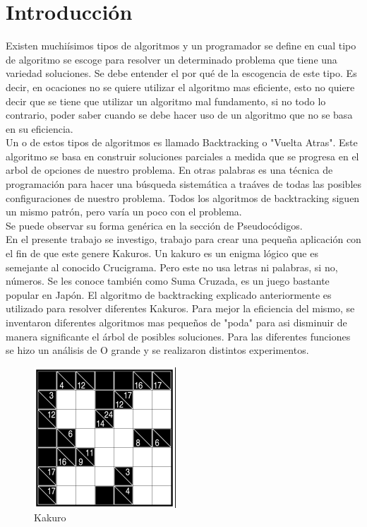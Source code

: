 \documentclass[conference]{IEEEtran}
\begin{document}
\section{Introducci\'on}
Existen muchi\'isimos tipos de algoritmos y un programador se define en cual tipo de algoritmo se escoge para resolver un determinado problema que tiene una variedad soluciones. Se debe entender el por qu\'e de la escogencia de este tipo. Es decir, en ocaciones no se quiere utilizar el algoritmo mas eficiente, esto no quiere decir que se tiene que utilizar un algoritmo mal fundamento, si no todo lo contrario, poder saber cuando se debe hacer uso de un algoritmo que no se basa en su eficiencia.\\
Un o de estos tipos de algoritmos es llamado Backtracking o "Vuelta Atras". Este algoritmo se basa en construir soluciones parciales a medida que se progresa en el arbol de opciones de nuestro problema.  En otras palabras es una t\'ecnica de programaci\'on para hacer una b\'usqueda sistem\'atica a tra\'aves de todas las posibles configuraciones de nuestro problema. Todos los algoritmos de backtracking siguen un mismo patr\'on, pero var\'ia un poco con el problema. \\Se puede observar su forma gen\'erica en la secci\'on de Pseudoc\'odigos.
\\
En el presente trabajo se investigo, trabajo para crear una pequeña aplicaci\'on con el fin de que este genere Kakuros.  Un kakuro es un enigma l\'ogico que es semejante al conocido Crucigrama. Pero este no usa letras ni palabras, si no, n\'umeros. Se les conoce tambi\'en como Suma Cruzada, es un juego bastante popular en Jap\'on. 
El algoritmo de backtracking explicado anteriormente es utilizado para resolver diferentes Kakuros. Para mejor la eficiencia del mismo, se inventaron diferentes algoritmos mas pequeños de "poda" para asi disminuir de manera significante el \'arbol de posibles soluciones.  Para las diferentes funciones se hizo un an\'alisis de O grande y se realizaron distintos experimentos.
\begin{figure}
	\includegraphics[scale=0.5]{kakuroImg.png}
	\caption{Kakuro}
\end{figure}
\end{document}
